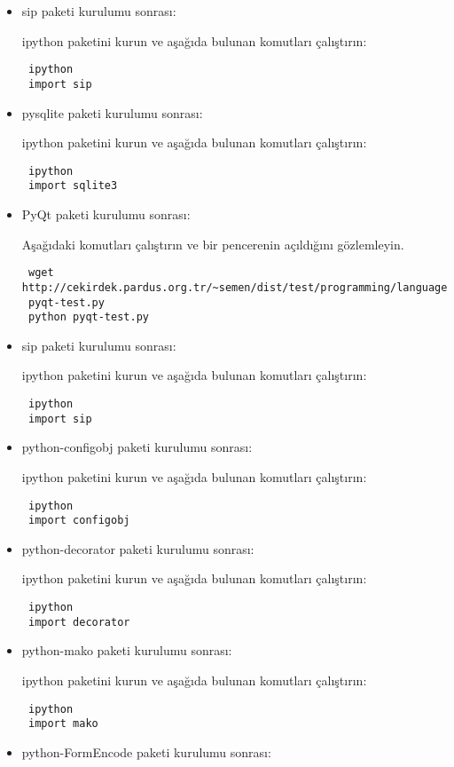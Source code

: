 \documentclass[a4paper,10pt]{article}
\begin{document}
\begin{itemize}
\item sip paketi kurulumu sonrası:

ipython paketini kurun ve aşağıda bulunan komutları çalıştırın:
\begin{verbatim}
 ipython
 import sip
\end{verbatim}
\item pysqlite paketi kurulumu sonrası:

ipython paketini kurun ve aşağıda bulunan komutları çalıştırın:
\begin{verbatim}
 ipython
 import sqlite3
\end{verbatim}


\item PyQt paketi kurulumu sonrası:

Aşağıdaki komutları çalıştırın ve bir pencerenin açıldığını gözlemleyin.
\begin{verbatim}
 wget http://cekirdek.pardus.org.tr/~semen/dist/test/programming/language/python/
 pyqt-test.py
 python pyqt-test.py
\end{verbatim}


\item sip paketi kurulumu sonrası:

ipython paketini kurun ve aşağıda bulunan komutları çalıştırın:
\begin{verbatim}
 ipython
 import sip
\end{verbatim}

\item python-configobj paketi kurulumu sonrası:

ipython paketini kurun ve aşağıda bulunan komutları çalıştırın:
\begin{verbatim}
 ipython
 import configobj
\end{verbatim}
\item python-decorator paketi kurulumu sonrası:

ipython paketini kurun ve aşağıda bulunan komutları çalıştırın:
\begin{verbatim}
 ipython
 import decorator
\end{verbatim}
\item python-mako paketi kurulumu sonrası:

ipython paketini kurun ve aşağıda bulunan komutları çalıştırın:
\begin{verbatim}
 ipython
 import mako
\end{verbatim}

\item python-FormEncode paketi kurulumu sonrası:


\end{itemize}
\end{document}
